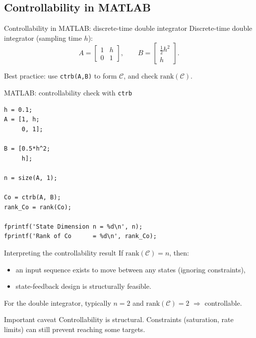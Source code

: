 \documentclass[aspectratio=169,10pt]{beamer}
\newcommand{\Ccal}{\mathcal{C}}
\begin{document}
\subsection{Controllability in MATLAB}

\begin{frame}{Controllability in MATLAB: discrete-time double integrator}
Discrete-time double integrator (sampling time \(h\)):
\[
A=\begin{bmatrix}1 & h\\0 & 1\end{bmatrix},
\qquad
B=\begin{bmatrix}\tfrac{1}{2}h^2\\h\end{bmatrix}.
\]

Best practice: use \texttt{ctrb(A,B)} to form \(\Ccal\), and check \(\mathrm{rank}(\Ccal)\).
\end{frame}

\begin{frame}[fragile]{MATLAB: controllability check with \texttt{ctrb}}
\begin{lstlisting}[caption={Checking controllability using \texttt{ctrb}.}]
% Discrete-time double integrator
h = 0.1;
A = [1, h;
     0, 1];

B = [0.5*h^2;
     h];

n = size(A, 1);

Co = ctrb(A, B);
rank_Co = rank(Co);

fprintf('State Dimension n = %d\n', n);
fprintf('Rank of Co      = %d\n', rank_Co);
\end{lstlisting}
\end{frame}

\begin{frame}{Interpreting the controllability result}
If \(\mathrm{rank}(\Ccal)=n\), then:
\begin{itemize}
  \item an input sequence exists to move between any states (ignoring constraints),
  \item state-feedback design is structurally feasible.
\end{itemize}

For the double integrator, typically \(n=2\) and \(\mathrm{rank}(\Ccal)=2\) \(\Rightarrow\) controllable.

\begin{notebox}{Important caveat}
Controllability is structural. Constraints (saturation, rate limits) can still prevent reaching some targets.
\end{notebox}
\end{frame}
\end{document}
